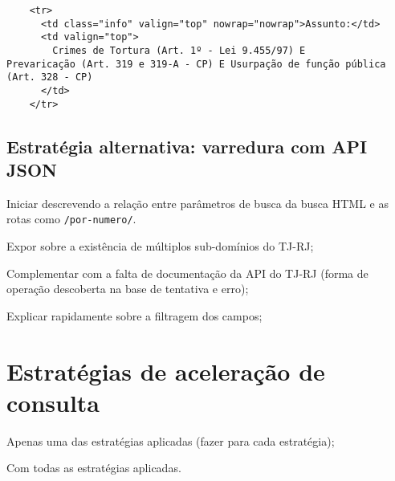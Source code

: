 \begin{verbatim}
    <tr>
      <td class="info" valign="top" nowrap="nowrap">Assunto:</td>
      <td valign="top">
        Crimes de Tortura (Art. 1º - Lei 9.455/97) E
Prevaricação (Art. 319 e 319-A - CP) E Usurpação de função pública
(Art. 328 - CP)
      </td>
    </tr>
\end{verbatim}

\subsection{Estratégia alternativa: varredura com API JSON}

\begin{todolist}
    \item Iniciar descrevendo a relação entre parâmetros de busca da busca HTML
          e as rotas como \texttt{/por-numero/}.
    \item Expor sobre a existência de múltiplos sub-domínios do TJ-RJ;
    \item Complementar com a falta de documentação da API do TJ-RJ (forma de
          operação descoberta na base de tentativa e erro);
    \item Explicar rapidamente sobre a filtragem dos campos;
\end{todolist}

\section{Estratégias de aceleração de consulta}


\begin{todolist}
    \item Apenas uma das estratégias aplicadas (fazer para cada estratégia);
    \item Com todas as estratégias aplicadas.
\end{todolist}

